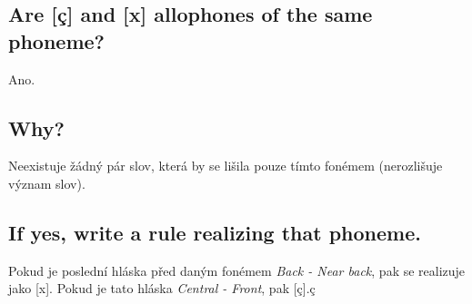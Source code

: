 \documentclass[a4paper]{article}
\begin{document}
\thispagestyle{fancy} %
{}

\subsection*{Are [ç] and [x] allophones of the same phoneme?}
Ano.

\subsection*{Why?}
Neexistuje žádný pár slov, která by se lišila pouze tímto fonémem (nerozlišuje význam slov). 

\subsection*{If yes, write a rule realizing that phoneme.}
Pokud je poslední hláska před daným fonémem \textit{Back - Near back}, pak se realizuje jako [x]. Pokud je tato hláska \textit{Central - Front}, pak [ç].ç
\end{document}
